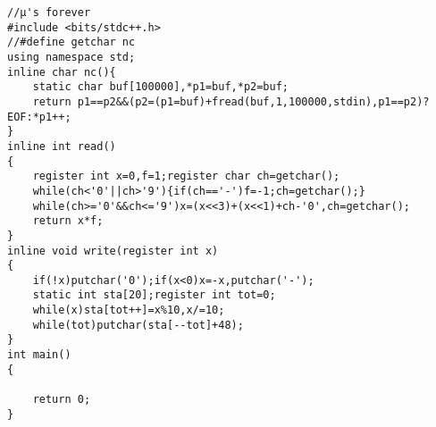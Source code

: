 \begin{verbatim}
//μ's forever
#include <bits/stdc++.h>
//#define getchar nc
using namespace std;
inline char nc(){
    static char buf[100000],*p1=buf,*p2=buf;
    return p1==p2&&(p2=(p1=buf)+fread(buf,1,100000,stdin),p1==p2)?EOF:*p1++;
}
inline int read()
{
    register int x=0,f=1;register char ch=getchar();
    while(ch<'0'||ch>'9'){if(ch=='-')f=-1;ch=getchar();}
    while(ch>='0'&&ch<='9')x=(x<<3)+(x<<1)+ch-'0',ch=getchar();
    return x*f;
}
inline void write(register int x)
{
    if(!x)putchar('0');if(x<0)x=-x,putchar('-');
    static int sta[20];register int tot=0;
    while(x)sta[tot++]=x%10,x/=10;
    while(tot)putchar(sta[--tot]+48);
}
int main()
{

    return 0;
}
\end{verbatim}
